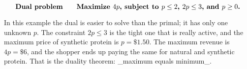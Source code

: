 \[\mbox{\bf Dual problem}\qquad\mbox{\bf Maximize $4p$, subject to $p\leq 2$, $2p\leq 3$, and $p\geq 0$.}\]

In this example the dual is easier to solve than the primal; it has only one unknown \(p\). The constraint \(2p\leq 3\) is the tight one that is really active, and the maximum price of synthetic protein is \(p=\$1.50\). The maximum revenue is \(4p=\$6\), and the shopper ends up paying the same for natural and synthetic protein. That is the duality theorem: _maximum equals minimum_.

